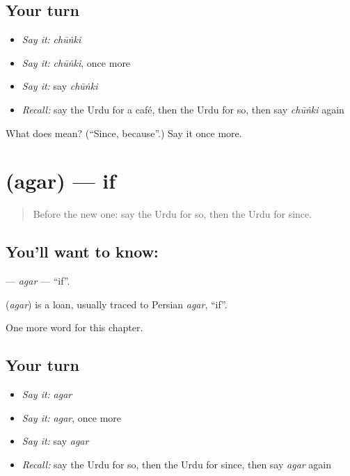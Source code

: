 \subsection*{Your turn}
\begin{itemize}
\raggedright
  \item \emph{Say it:} \emph{chūṅki}
  \item \emph{Say it:} \emph{chūṅki}, once more
  \item \emph{Say it:} say \emph{chūṅki}
  \item \emph{Recall:} say the Urdu for a café, then the Urdu for so, then say \emph{chūṅki} again
\end{itemize}

\begin{tcolorbox}[breakable,colback=teal!4,colframe=teal!35!black,title={Before you move on}]
What does  mean? (\textquotedblleft{}Since, because\textquotedblright{}.) Say it once more.
\end{tcolorbox}
\section[\texorpdfstring{\ur{اگر} (agar)}{اگر (agar)}]{ (agar) — if}

\label{lesson:UR-C159-agar}



\begin{quote}
Before the new one: say the Urdu for so, then the Urdu for since.
\end{quote}

\subsection*{You'll want to know: }
\textbf{} — \emph{agar} — \textquotedblleft{}if\textquotedblright{}.

\begin{cousinweb}
\textbf{} (\emph{agar}) is a loan, usually traced to Persian \emph{agar}, \textquotedblleft{}if\textquotedblright{}.
\end{cousinweb}

\begin{grammarlens}[title={What you've built}]
One more word for this chapter.
\end{grammarlens}

\subsection*{Your turn}
\begin{itemize}
\raggedright
  \item \emph{Say it:} \emph{agar}
  \item \emph{Say it:} \emph{agar}, once more
  \item \emph{Say it:} say \emph{agar}
  \item \emph{Recall:} say the Urdu for so, then the Urdu for since, then say \emph{agar} again
\end{itemize}

